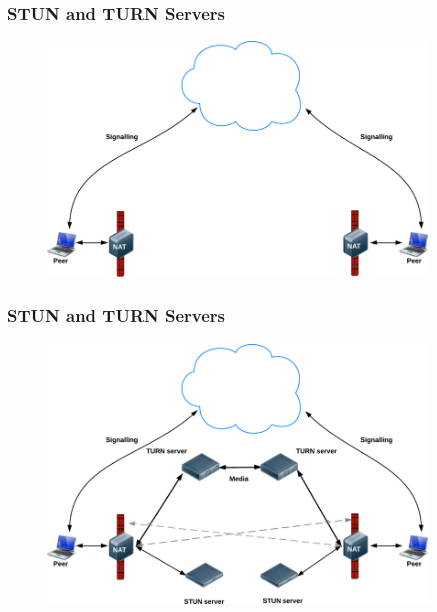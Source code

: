 \documentclass{beamer}
\begin{document}
\begin{frame}[t]\frametitle{STUN and TURN Servers}
\begin{figure}
\centering
\includegraphics[keepaspectratio=true, width=0.9\textwidth]{images/firewall}
\end{figure}
\end{frame}

\begin{frame}[t]\frametitle{STUN and TURN Servers}
\begin{figure}
\centering
\includegraphics[keepaspectratio=true, width=0.9\textwidth]{images/turn}
\end{figure}
\end{frame}
\end{document}
